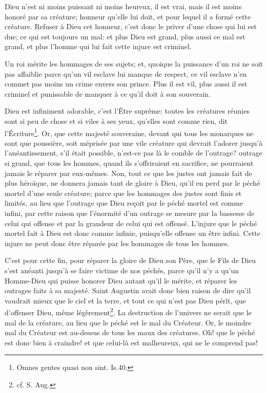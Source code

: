 \documentclass[instructions.tex]{subfiles}
\begin{document}
Dieu n'est ni moins puissant ni moins heureux, il est vrai, mais il est moins honoré par sa créature; honneur qu'elle lui doit, et pour lequel il a formé cette créature. Refuser à Dieu cet honneur, c'est donc le priver d'une chose qui lui est due; ce qui est toujours un mal: et plus Dieu est grand, plus aussi ce mal est grand, et plus l'homme qui lui fait cette injure est criminel.

Un roi mérite les hommages de ses sujets; et, quoique la puissance d'un roi ne soit pas affaiblie parce qu'un vil esclave lui manque de respect, ce vil esclave n'en commet pas moins un crime envers son prince. Plus il est vil, plus aussi il est criminel et punissable de manquer à ce qu'il doit à son souverain.

Dieu est infiniment adorable, c'est l'Être suprême: toutes les créatures réunies sont si peu de chose et si viles à ses yeux, qu'elles sont comme rien, dit l'Écriture\footnote{Omnes gentes quasi non sint. Is.40.}. Or, que cette majesté souveraine, devant qui tous les monarques ne sont que poussière, soit méprisée par une vile créature qui devrait l'adorer jusqu'à l'anéantissement, s'il était possible, n'est-ce pas là le comble de l'outrage? outrage si grand, que tous les hommes, quand ils s'offriraient en sacrifice, ne pourraient jamais le réparer par eux-mêmes. Non, tout ce que les justes ont jamais fait de plus héroïque, ne donnera jamais tant de gloire à Dieu, qu'il en perd par le péché mortel d'une seule créature; parce que les hommages des justes sont finis et limités, au lieu que l'outrage que Dieu reçoit par le péché mortel est comme infini, par cette raison que l'énormité d'un outrage se mesure par la bassesse de celui qui offense et par la grandeur de celui qui est offensé. L'injure que le péché mortel fait à Dieu est donc comme infinie, puisqu'elle offense un être infini. Cette injure ne peut donc être réparée par les hommages de tous les hommes.

C'est pour cette fin, pour réparer la gloire de Dieu son Père, que le Fils de Dieu s'est anéanti jusqu'à se faire victime de nos péchés, parce qu'il n'y a qu'un Homme-Dieu qui puisse honorer Dieu autant qu'il le mérite, et réparer les outrages faits à sa majesté. Saint Augustin avait donc bien raison de dire qu'il vaudrait mieux que le ciel et la terre, et tout ce qui n'est pas Dieu pérît, que d'offenser Dieu, même légèrement\footnote{cf. S. Aug.}. La destruction de l'univers ne serait que le mal de la créature, au lieu que le péché est le mal du Créateur. Or, le moindre mal du Créateur est au-dessus de tous les maux des créatures. Oh! que le péché est donc bien à craindre! et que celui-là est malheureux, qui ne le comprend pas!
\end{document}

